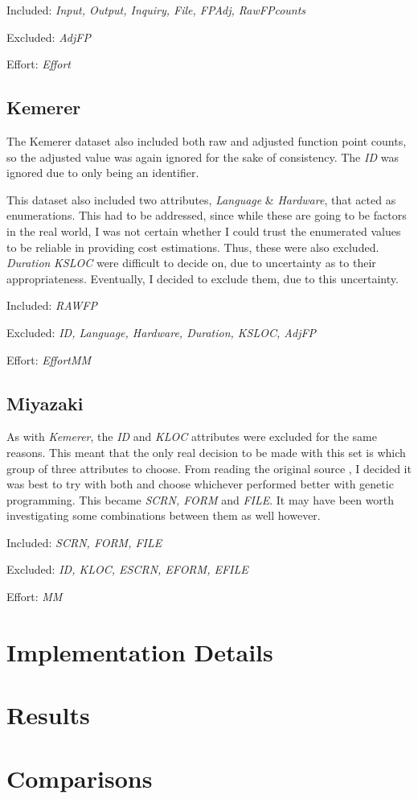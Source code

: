 \documentclass[10pt, a4paper]{article}
\begin{document}
Included: \emph{Input, Output, Inquiry, File, FPAdj, RawFPcounts}

Excluded: \emph{AdjFP}

Effort: \emph{Effort}

\subsection{Kemerer} %
\label{sub:kemerer}
The Kemerer dataset also included both raw and adjusted function point counts,
so the adjusted value was again ignored for the sake of consistency. The
\emph{ID} was ignored due to only being an identifier.

This dataset also included two attributes, \emph{Language} \& \emph{Hardware},
that acted as enumerations. This had to be addressed, since while these are going
to be factors in the real world, I was not certain whether I could trust the
enumerated values to be reliable in providing cost estimations. Thus, these were
also excluded. \emph{Duration} \emph{KSLOC} were difficult to decide on, due to
uncertainty as to their appropriateness. Eventually, I decided to exclude them,
due to this uncertainty.

Included: \emph{RAWFP}

Excluded: \emph{ID, Language, Hardware, Duration, KSLOC, AdjFP}

Effort: \emph{EffortMM}

\subsection{Miyazaki} %
\label{sub:miyazaki}
As with \emph{Kemerer}, the \emph{ID} and \emph{KLOC} attributes were excluded
for the same reasons. This meant that the only real decision to be made with
this set is which group of three attributes to choose. From reading the original
source \cite[Section~4.2]{MIYAZAKI19943}, I decided it was best to try with both
and choose whichever performed better with genetic programming. This became
\emph{SCRN, FORM} and \emph{FILE}. It may have been worth investigating some
combinations between them as well however.

Included: \emph{SCRN, FORM, FILE}

Excluded: \emph{ID, KLOC, ESCRN, EFORM, EFILE}

Effort: \emph{MM}

\section{Implementation Details} %
\label{sec:implementation_details}

\section{Results} %
\label{sec:results}

\section{Comparisons} %
\label{sec:comparisons}

 
\end{document}
